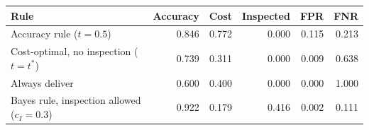 \begin{tabular}{lrrrrr}
\toprule
Rule & Accuracy & Cost & Inspected & FPR & FNR \\
\midrule
Accuracy rule ($t=0.5$) & 0.846 & 0.772 & 0.000 & 0.115 & 0.213 \\
Cost-optimal, no inspection ($t=t^\ast$) & 0.739 & 0.311 & 0.000 & 0.009 & 0.638 \\
Always deliver & 0.600 & 0.400 & 0.000 & 0.000 & 1.000 \\
Bayes rule, inspection allowed ($c_I=0.3$) & 0.922 & 0.179 & 0.416 & 0.002 & 0.111 \\
\bottomrule
\end{tabular}
